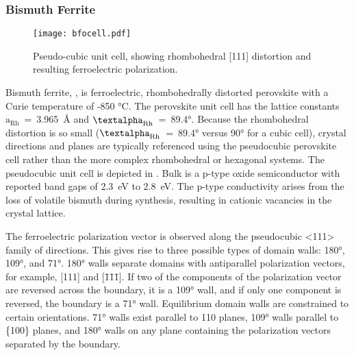 \subsubsection{Bismuth Ferrite}
\label{subsubsec:background.bfo}

\begin{figure}
\begin{center}
\texttt{[image: bfocell.pdf]}
\caption[Pseudo-cubic  unit cell]{%
	Pseudo-cubic  unit cell, showing rhombohedral [111] 
	distortion and resulting ferroelectric polarization.\cite{Catalan:2009ca}}
\label{fig:bfocell}
\end{center}
\end{figure}

Bismuth ferrite, , is ferroelectric, rhombohedrally distorted perovskite with a
Curie temperature of -850
\si{\degreeCelsius}.\cite{Kornev:2007jr,Catalan:2009ca,Anonymous:htMDB4Eh,Miao:2008fz} The
perovskite unit cell has the lattice constants
$\text{a}_{\text{Rh}}$~=~3.965~\si{\angstrom} and
$\text{\textalpha}_{\text{Rh}}$~=~89.4\si{\degree}.\cite{Kubel:1990kd} Because the
rhombohedral distortion is so small ($\text{\textalpha}_{\text{Rh}}$~=~89.4\si{\degree}
versus 90\si{\degree} for a cubic cell), crystal directions and planes are typically
referenced using the pseudocubic perovskite cell rather than the more complex rhombohedral
or hexagonal systems.  The pseudocubic unit cell is depicted in . Bulk
 is a p-type oxide semiconductor with reported band gaps of 2.3~eV to
2.8~eV.\cite{Ihlefeld:2008hl,Clark:2007bt,Kumar:2008fr} The p-type conductivity arises
from the loss of volatile bismuth during synthesis, resulting in cationic vacancies in the
crystal lattice. 

The ferroelectric polarization vector is observed along the pseudocubic <111> family of
directions.\cite{Catalan:2009ca} This gives rise to three possible types of domain walls:
180\si{\degree}, 109\si{\degree}, and 71\si{\degree}. 180\si{\degree} walls separate
domains with antiparallel polarization vectors, for example, [111] and [\={1}\={1}\={1}].
If two of the components of the polarization vector are reversed across the boundary, it
is a 109\si{\degree} wall, and if only one component is reversed, the boundary is a
71\si{\degree} wall. Equilibrium domain walls are constrained to certain orientations.
71\si{\degree} walls exist parallel to {110} planes, 109\si{\degree} walls parallel to
\{100\} planes, and 180\si{\degree} walls on any plane containing the polarization vectors
separated by the boundary.\cite{Streiffer:1998vt}

